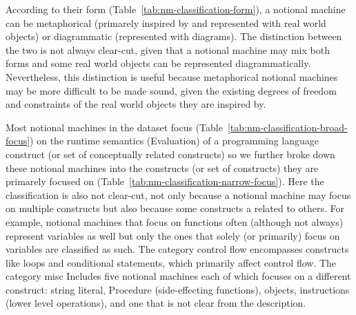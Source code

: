 %
According to their form (Table~\ref{tab:nm-classification-form}),
a notional machine
can be
metaphorical (primarely inspired by and represented with real world objects) or
diagrammatic (represented with diagrams).
The distinction between the two is not always clear-cut,
given that
a notional machine may mix both forms
and
some real world objects can be represented diagrammatically.
%
Nevertheless, this distinction is useful because metaphorical notional machines may be more difficult to be made sound, given the existing degrees of freedom and constraints of the real world objects they are inspired by.


Most notional machines in the dataset focus (Table~\ref{tab:nm-classification-broad-focus})
on the runtime semantics (Evaluation) of a programming language construct
(or set of conceptually related constructs)
so
%
we further
broke down these notional machines into the constructs (or set of constructs) they are primarely focused on (Table~\ref{tab:nm-classification-narrow-focus}).
%
%
Here the classification is also not clear-cut,
not only because a notional machine may focus on multiple constructs
but also because some constructs a related to others.
For example,
notional machines that focus on functions often (although not always) represent variables as well
but only the ones that solely (or primarily) focus on variables are classified as such.
The category control flow encompasses constructs like loops and conditional statements, which primarily affect control flow.
%
The category misc
Includes five notional machines each of which focuses on a different construct:
string literal,
Procedure (side-effecting functions),
objects,
instructions (lower level operations),
and
one that is not clear from the description.


